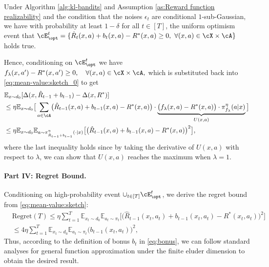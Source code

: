 \documentclass[11pt]{article}
\newcommand{\rE}{\mathbb E}
\begin{document}
\begin{lemma}\label{lm:Confidence Bound for Reward Function}
    Under Algorithm \ref{alg:kl-bandits} and Assumption \ref{as:Reward function realizability} and the condition that the noises $\epsilon_t$ are conditional $1$-sub-Gaussian, we have with probability at least $1-\delta$ for all $t\in[T]$, the uniform optimism event that $\cE_{\opt}^t=\{\hat{R}_t(x,a)+b_t(x,a)-R^*(x,a) \ge 0,~\forall(x,a)\in\cX\times\cA\}$ holds true.
\end{lemma}
Hence, conditioning on $\cE_{\opt}^t$ we have $f_\lambda(x,a') - R^*(x,a') \ge 0,\quad \forall(x,a)\in\cX\times\cA,$ which is substituted back into \eqref{eq:mean-value:sketch_0} to get 
\begin{equation}
\begin{aligned} 
    &\rE_{x \sim d_0}[\Delta(x, \hat R_{t - 1} + b_{t - 1}) - \Delta(x, R^*)]  
     \\&\le \eta \rE_{x \sim d_0} \big[\sum_{a \in \cA} \bigl(\hat R_{t - 1}(x, a) + b_{t - 1}(x, a) - R^*(x, a)\bigr) \cdot \underbrace{\bigl(f_\lambda(x, a) - R^*(x, a)\bigr) \cdot \pi_{f_\lambda}^\eta(a|x)}_{U(x,a)}\big]
     \\&\le \eta \rE_{x \sim d_0} \rE_{a\sim \pi_{\hat R_{t - 1} + b_{t - 1}}^\eta(\cdot|x)} \big[ \bigl(\hat R_{t - 1}(x, a) + b_{t - 1}(x, a) - R^*(x, a)\bigr)^2 \big], \label{eq:mean-value:sketch}
\end{aligned}
\end{equation}
where the last inequality holds since by taking the derivative of $U(x,a)$ with respect to $\lambda$, we can show that $U(x,a)$ reaches the maximum when $\lambda = 1$.

\paragraph{Part IV: Regret Bound.} Conditioning on high-probability event $\cup_{t\in[T]}\cE_\opt^t$, we derive the regret bound from \eqref{eq:mean-value:sketch}:
\begin{equation*}
\begin{aligned}
    &\mathrm{Regret}(T) \le \eta\sum_{t=1}^T\rE_{x_t \sim d_0} \rE_{a_t\sim \pi_t} \big[ \bigl(\hat R_{t - 1}(x_t, a_t) + b_{t - 1}(x_t, a_t) - R^*(x_t, a_t)\bigr)^2 \big]\\
    &\le 4\eta\sum_{t=1}^T\rE_{x_t \sim d_0} \rE_{a_t\sim \pi_t} \bigl(b_{t - 1}(x_t, a_t)\bigr)^2,
\end{aligned}
\end{equation*}
Thus, according to the definition of bonus $b_t$ in \eqref{eq:bonus}, we can follow standard analyses for general function approximation under the finite eluder dimension to obtain the desired result.
\end{document}
